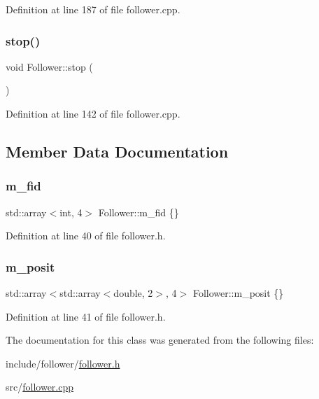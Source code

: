 Definition at line 187 of file follower.\+cpp.

\mbox{\label{class_follower_a84c17a75630c27bea4f401c8ab8e45b2}} 
\subsubsection{\texorpdfstring{stop()}{stop()}}
{\footnotesize\ttfamily void Follower\+::stop (\begin{DoxyParamCaption}{ }\end{DoxyParamCaption})}



Definition at line 142 of file follower.\+cpp.



\subsection{Member Data Documentation}
\mbox{\label{class_follower_a350054bbd7659d493cccc4b4ad9bc460}} 
\subsubsection{\texorpdfstring{m\+\_\+fid}{m\_fid}}
{\footnotesize\ttfamily std\+::array$<$int, 4$>$ Follower\+::m\+\_\+fid \{\}}



Definition at line 40 of file follower.\+h.

\mbox{\label{class_follower_a6d4e1ebbe79cc8af601d53cba7aeb30a}} 
\subsubsection{\texorpdfstring{m\+\_\+posit}{m\_posit}}
{\footnotesize\ttfamily std\+::array$<$std\+::array$<$double, 2$>$, 4$>$ Follower\+::m\+\_\+posit \{\}}



Definition at line 41 of file follower.\+h.



The documentation for this class was generated from the following files\+:\begin{DoxyCompactItemize}
\item 
include/follower/\hyperlink{follower_8h}{follower.\+h}\item 
src/\hyperlink{follower_8cpp}{follower.\+cpp}\end{DoxyCompactItemize}
